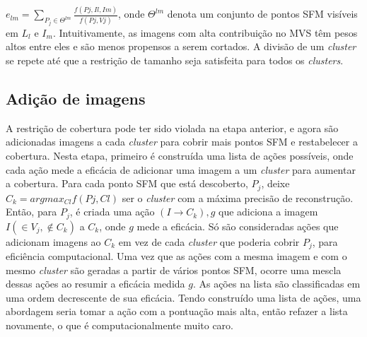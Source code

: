 \begin{itemize}
$e_{lm} = \sum_{P_j \in \Theta ^{lm}} \frac{f(Pj,{Il, Im})}{f(Pj, Vj )}$, onde $\Theta ^{lm}$ denota um conjunto de pontos SFM visíveis em $L_l$ e $I_m$. Intuitivamente, as imagens com alta contribuição no MVS têm pesos altos entre eles e são menos propensos a serem cortados. A divisão de um {\it cluster} se repete até que a restrição de tamanho seja satisfeita para todos os {\it clusters}.

\subsection{Adição de imagens}
A restrição de cobertura pode ter sido violada na etapa anterior, e agora são adicionadas imagens a cada {\it cluster} para cobrir mais pontos SFM e restabelecer a cobertura. Nesta etapa, primeiro é construída uma lista de ações possíveis, onde cada ação mede a eficácia de adicionar uma imagem a um {\it cluster} para aumentar a cobertura. Para cada ponto SFM que está descoberto, $P_j$, deixe $C_k = argmax_{Cl} f(Pj, Cl)$ ser o {\it cluster} com a máxima precisão de reconstrução. 
Então, para $P_j$, é criada uma ação ${(I \rightarrow C_k), g}$ que adiciona a imagem $I (\in V_j, \not\in C_k)$ a $C_k$, onde $g$ mede a eficácia. Só são consideradas ações que adicionam imagens ao $C_k$ em vez de cada {\it cluster} que poderia cobrir $P_j$, para eficiência computacional. Uma vez que as ações com a mesma imagem e com o mesmo {\it cluster} são geradas a partir de vários pontos SFM, ocorre uma mescla dessas ações ao resumir a eficácia medida $g$. As ações na lista são classificadas em uma ordem decrescente de sua eficácia. Tendo construído uma lista de ações, uma abordagem seria tomar a ação com a pontuação mais alta, então refazer a lista novamente, o que é computacionalmente muito caro. 


\end{itemize}
